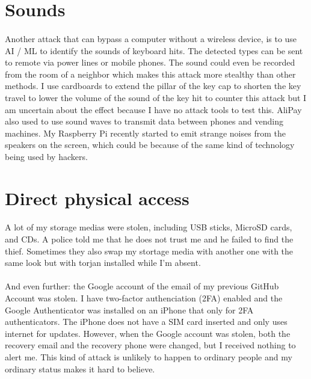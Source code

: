 \documentclass[mscthesis]{usiinfthesis}
\begin{document}
\section{Sounds}
\paragraph{}
Another attack that can bypass a computer without a wireless device, is to use AI / ML to identify the sounds of keyboard hits. The detected types can be sent to remote via power lines or mobile phones. The sound could even be recorded from the room of a neighbor which makes this attack more stealthy than other methods. I use cardboards to extend the pillar of the key cap to shorten the key travel to lower the volume of the sound of the key hit to counter this attack but I am uncertain about the effect because I have no attack tools to test this. AliPay also used to use sound waves to transmit data between phones and vending machines. My Raspberry Pi recently started to emit strange noises from the speakers on the screen, which could be because of the same kind of technology being used by hackers.

\section{Direct physical access}
\paragraph{}
A lot of my storage medias were stolen, including USB sticks, MicroSD cards, and CDs. A police told me that he does not trust me and he failed to find the thief. Sometimes they also swap my stortage media with another one with the same look but with torjan installed while I'm absent.
\paragraph{}
And even further: the Google account of the email of my previous GitHub Account was stolen. I have two-factor authenciation (2FA) enabled and the Google Authenticator was installed on an iPhone that only for 2FA authenticators. The iPhone does not have a SIM card inserted and only uses internet for updates. However, when the Google account was stolen, both the recovery email and the recovery phone were changed, but I received nothing to alert me. This kind of attack is unlikely to happen to ordinary people and my ordinary status makes it hard to believe.
\end{document}
